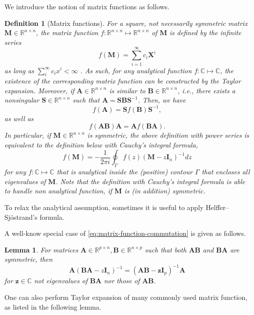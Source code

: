 \documentclass[MAL,biber]{nowfnt} %
\newcommand{\RED}{\color[rgb]{0.70,0,0}}
\newtheorem{Lemma}{Lemma}
\newtheorem{Definition}{Definition}
\newcommand{\A}{{\mathbf{A}}}
\newcommand{\B}{{\mathbf{B}}}
\newcommand{\I}{{\mathbf{I}}}
\newcommand{\M}{{\mathbf{M}}}
\renewcommand{\S}{{\mathbf{S}}}
\newcommand{\X}{{\mathbf{X}}}
\newcommand{\z}{{\mathbf{z}}}
\newcommand{\RR}{{\mathbb{R}}}
\newcommand{\CC}{{\mathbb{C}}}
\begin{document}
We introduce the notion of matrix functions as follows.
\begin{Definition}[Matrix functions]
For a square, not necessarily symmetric matrix $\M \in \RR^{n \times n}$, the matrix function $f: \RR^{n \times n} \mapsto \RR^{n \times n}$ of $\M$ is defined by the infinite series 
\begin{equation}\label{eq:def-matrix-function-power-series}
	f(\M) = \sum_{i=1}^\infty c_i \X^i
\end{equation}
as long as $\sum_i^\infty c_i x^i < \infty$ \citep{}. As such, for any analytical function $f: \CC \mapsto \CC$, the existence of the corresponding matrix function can be constructed by the Taylor expansion. Moreover, if $\A \in \RR^{n \times n}$ is similar to $\B \in \RR^{n \times n}$, i.e., there exists a nonsingular $\S \in \RR^{n \times n}$ such that $\A = \S \B \S^{-1}$. Then, we have
\[
	f(\A) = \S f(\B) \S^{-1},
\]
as well as 
\begin{equation}\label{eq:matrix-function-commutation}
	f(\A \B) \A = \A f(\B \A).
\end{equation}
In particular, if $\M \in \RR^{n \times n}$ is symmetric, the above definition with power series is equivalent to the definition below with Cauchy's integral formula,
\begin{equation}\label{eq:def-matrix-function-cauchy}
	f(\M) = -\frac1{2\pi i} \oint_\Gamma f(z) (\M - z \I_n)^{-1} dz
\end{equation}
for any $f: \CC \mapsto \CC$ that is analytical inside the (positive) contour $\Gamma$ that encloses all eigenvalues of $\M$. Note that the definition with Cauchy's integral formula is able to handle non analytical function, if $\M$ is (in addition) symmetric.
\end{Definition}
{\RED To relax the analytical assumption, sometimes it is useful to apply Helffer–Sjöstrand’s formula.}

A well-know special case of \eqref{eq:matrix-function-commutation} is given as follows.
\begin{Lemma}
For matrices $\A \in \RR^{p \times n}, \B \in \RR^{n \times p}$ such that both $\A \B$ and $\B \A$ are symmetric, then
\[
	\A (\B \A - z \I_n)^{-1} = (\A \B - \z \I_p)^{-1} \A
\]
for $\z \in \CC$ not eigenvalues of $\B \A$ nor those of $\A \B$.
\end{Lemma}

One can also perform Taylor expansion of many commonly used matrix function, as listed in the following lemma.
\end{document}
